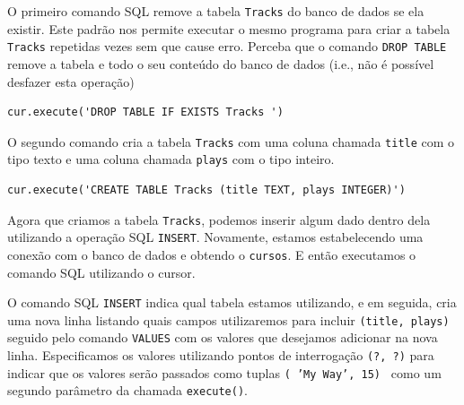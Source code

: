 O primeiro comando SQL remove a tabela {\tt Tracks} do banco de dados se ela
existir. Este padrão nos permite executar o mesmo programa para criar a tabela
{\tt Tracks} repetidas vezes sem que cause erro. Perceba que o comando {\tt DROP
  TABLE} remove a tabela e todo o seu conteúdo do banco de dados (i.e., não é
possível desfazer esta operação)

\beforeverb
\begin{verbatim}
cur.execute('DROP TABLE IF EXISTS Tracks ')
\end{verbatim}
\afterverb
%
%
O segundo comando cria a tabela {\tt Tracks} com uma coluna chamada {\tt title}
com o tipo texto e uma coluna chamada {\tt plays} com o tipo inteiro.

\beforeverb
\begin{verbatim}
cur.execute('CREATE TABLE Tracks (title TEXT, plays INTEGER)')
\end{verbatim}
\afterverb
%
%
Agora que criamos a tabela {\tt Tracks}, podemos inserir algum dado dentro
dela utilizando a operação SQL {\tt INSERT}. Novamente, estamos
estabelecendo uma conexão com o banco de dados e obtendo o {\tt cursos}.
E então executamos o comando SQL utilizando o cursor.


O comando SQL {\tt INSERT} indica qual tabela estamos utilizando, e em seguida, 
cria uma nova linha listando quais campos utilizaremos para incluir {\tt (title,
  plays)} seguido pelo comando {\tt VALUES} com os valores que desejamos
adicionar na nova linha. Especificamos os valores utilizando pontos de
interrogação {\tt (?, ?)} para indicar que os valores serão passados como
tuplas {\tt ( 'My Way', 15) } como um segundo parâmetro da chamada
{\tt execute()}.

